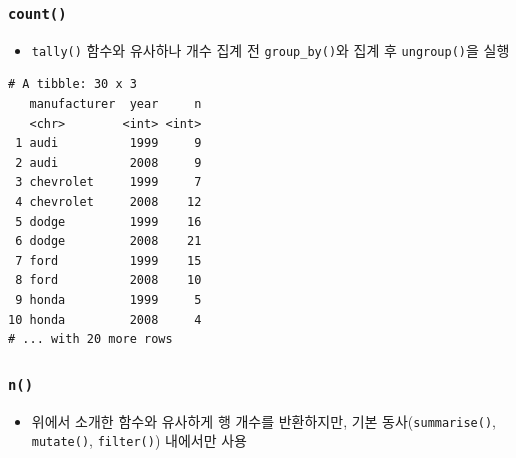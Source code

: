 \documentclass[
  11pt,
]{krantz}
\newenvironment{Shaded}{\begin{snugshade}}{\end{snugshade}}
\newcommand{\CommentTok}[1]{\textcolor[rgb]{0.37,0.37,0.37}{\textit{#1}}}
\newcommand{\DataTypeTok}[1]{\textcolor[rgb]{0.27,0.27,0.27}{#1}}
\newcommand{\KeywordTok}[1]{\textcolor[rgb]{0.27,0.27,0.27}{\textbf{#1}}}
\newcommand{\NormalTok}[1]{#1}
\newcommand{\OperatorTok}[1]{\textcolor[rgb]{0.43,0.43,0.43}{\textbf{#1}}}
\newcommand{\StringTok}[1]{\textcolor[rgb]{0.5,0.5,0.5}{#1}}
\providecommand{\tightlist}{%
  \setlength{\itemsep}{0pt}\setlength{\parskip}{0pt}}
\begin{document}
\normalsize

\hypertarget{count}{%
\subsubsection*{\texorpdfstring{\texttt{count()}}{count()}}\label{count}}


\begin{itemize}
\tightlist
\item
  \texttt{tally()} 함수와 유사하나 개수 집계 전 \texttt{group\_by()}와 집계 후 \texttt{ungroup()}을 실행
\end{itemize}

\footnotesize

\begin{Shaded}
\end{Shaded}

\begin{verbatim}
# A tibble: 30 x 3
   manufacturer  year     n
   <chr>        <int> <int>
 1 audi          1999     9
 2 audi          2008     9
 3 chevrolet     1999     7
 4 chevrolet     2008    12
 5 dodge         1999    16
 6 dodge         2008    21
 7 ford          1999    15
 8 ford          2008    10
 9 honda         1999     5
10 honda         2008     4
# ... with 20 more rows
\end{verbatim}

\normalsize

\hypertarget{n-dplyr}{%
\subsubsection*{\texorpdfstring{\texttt{n()}}{n()}}\label{n-dplyr}}


\begin{itemize}
\tightlist
\item
  위에서 소개한 함수와 유사하게 행 개수를 반환하지만, 기본 동사(\texttt{summarise()}, \texttt{mutate()}, \texttt{filter()}) 내에서만 사용
\end{itemize}

\footnotesize

\begin{Shaded}
\end{Shaded}
\end{document}
